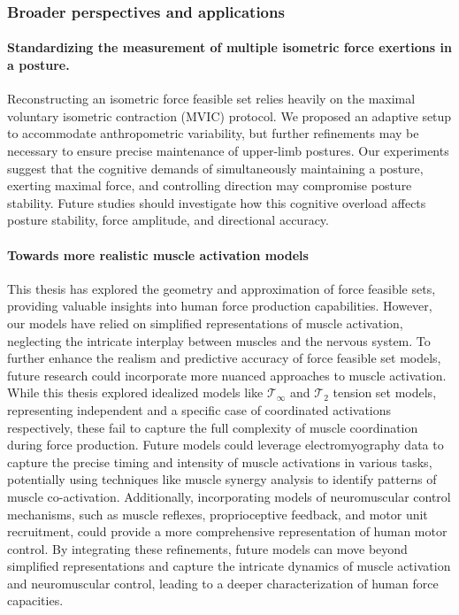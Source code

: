 \subsubsection*{Broader perspectives and applications}

\paragraph*{Standardizing the measurement of multiple isometric force exertions in a posture.}
Reconstructing an isometric force feasible set relies heavily on the maximal voluntary isometric contraction (MVIC) protocol. We proposed an adaptive setup to accommodate anthropometric variability, but further refinements may be necessary to ensure precise maintenance of upper-limb postures. Our experiments suggest that the cognitive demands of simultaneously maintaining a posture, exerting maximal force, and controlling direction may compromise posture stability. Future studies should investigate how this cognitive overload affects posture stability, force amplitude, and directional accuracy.

\paragraph*{Towards more realistic muscle activation models}
This thesis has explored the geometry and approximation of force feasible sets, providing valuable insights into human force production capabilities. However, our models have relied on simplified representations of muscle activation, neglecting the intricate interplay between muscles and the nervous system. To further enhance the realism and predictive accuracy of force feasible set models, future research could incorporate more nuanced approaches to muscle activation. While this thesis explored idealized models like $\mathcal{T}_\infty$ and $\mathcal{T}_2$ tension set models, representing independent and a specific case of coordinated activations respectively, these fail to capture the full complexity of muscle coordination during force production. Future models could leverage electromyography data to capture the precise timing and intensity of muscle activations in various tasks, potentially using techniques like muscle synergy analysis to identify patterns of muscle co-activation. Additionally, incorporating models of neuromuscular control mechanisms, such as muscle reflexes, proprioceptive feedback, and motor unit recruitment, could provide a more comprehensive representation of human motor control. By integrating these refinements, future models can move beyond simplified representations and capture the intricate dynamics of muscle activation and neuromuscular control, leading to a deeper characterization of human force capacities.

